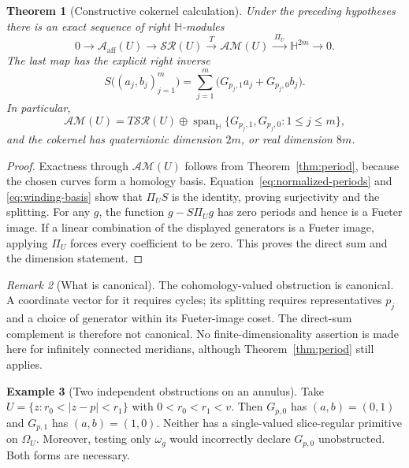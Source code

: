 \documentclass[11pt,a4paper]{article}
\numberwithin{equation}{section}
\newtheorem{theorem}{Theorem}[section]
\theoremstyle{definition}
\newtheorem{example}[theorem]{Example}
\theoremstyle{remark}
\newtheorem{remark}[theorem]{Remark}
\newcommand{\HH}{\mathbb H}
\newcommand{\SR}{\mathcal{SR}}
\newcommand{\AM}{\mathcal{AM}}
\newcommand{\Aff}{\mathcal{A}_{\mathrm{aff}}}
\begin{document}
\begin{theorem}[Constructive cokernel calculation]\label{thm:split}
Under the preceding hypotheses there is an exact sequence of right
$\HH$-modules
\begin{equation}
 0\longrightarrow\Aff(U)\longrightarrow\SR(U)
 \xrightarrow{\;T\;}\AM(U)
 \xrightarrow{\;\Pi_U\;}\HH^{2m}\longrightarrow0.
 \label{eq:exact}
\end{equation}
The last map has the explicit right inverse
\begin{equation}
 S\bigl((a_j,b_j)_{j=1}^m\bigr)
 =\sum_{j=1}^m\bigl(G_{p_j,1}a_j+G_{p_j,0}b_j\bigr).
 \label{eq:split-map}
\end{equation}
In particular,
\begin{equation}
 \AM(U)=T\SR(U)\oplus
 \operatorname{span}_{\HH}\{G_{p_j,1},G_{p_j,0}:1\le j\le m\},
 \label{eq:direct-sum}
\end{equation}
and the cokernel has quaternionic dimension $2m$, or real dimension $8m$.
\end{theorem}
\begin{proof}
Exactness through $\AM(U)$ follows from Theorem~\ref{thm:period}, because the
chosen curves form a homology basis. Equation~\eqref{eq:normalized-periods}
and \eqref{eq:winding-basis} show that $\Pi_U S$ is the identity, proving
surjectivity and the splitting. For any $g$, the function
$g-S\Pi_Ug$ has zero periods and hence is a Fueter image. If a linear
combination of the displayed generators is a Fueter image, applying $\Pi_U$
forces every coefficient to be zero. This proves the direct sum and the
dimension statement.
\end{proof}

\begin{remark}[What is canonical]
The cohomology-valued obstruction is canonical. A coordinate vector for it
requires cycles; its splitting requires representatives $p_j$ and a choice of
generator within its Fueter-image coset. The direct-sum complement is
therefore not canonical. No finite-dimensionality assertion is made here for
infinitely connected meridians, although Theorem~\ref{thm:period} still applies.
\end{remark}

\begin{example}[Two independent obstructions on an annulus]
Take $U=\{z: r_0<|z-p|<r_1\}$ with $0<r_0<r_1<v$.
Then $G_{p,0}$ has $(a,b)=(0,1)$ and $G_{p,1}$ has $(a,b)=(1,0)$.
Neither has a single-valued slice-regular primitive on $\Omega_U$.
Moreover, testing only $\omega_g$ would incorrectly declare $G_{p,0}$
unobstructed. Both forms are necessary.
\end{example}
\end{document}
